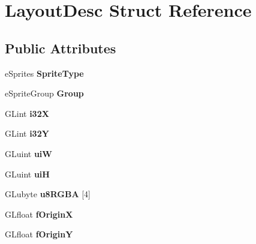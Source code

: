 \hypertarget{struct_layout_desc}{\section{Layout\+Desc Struct Reference}
\label{struct_layout_desc}
}
\subsection*{Public Attributes}
\begin{DoxyCompactItemize}
\item 
\hypertarget{struct_layout_desc_a44f11d6a49f45063d018ef98ec161255}{e\+Sprites {\bfseries Sprite\+Type}}\label{struct_layout_desc_a44f11d6a49f45063d018ef98ec161255}

\item 
\hypertarget{struct_layout_desc_a92135d802e4a7afaa841b646a730f643}{e\+Sprite\+Group {\bfseries Group}}\label{struct_layout_desc_a92135d802e4a7afaa841b646a730f643}

\item 
\hypertarget{struct_layout_desc_a47206d5249cc4ba35d05ebf4bf2d63b0}{G\+Lint {\bfseries i32\+X}}\label{struct_layout_desc_a47206d5249cc4ba35d05ebf4bf2d63b0}

\item 
\hypertarget{struct_layout_desc_a6d24bb78b1d4b19a9faa77e552e17cbe}{G\+Lint {\bfseries i32\+Y}}\label{struct_layout_desc_a6d24bb78b1d4b19a9faa77e552e17cbe}

\item 
\hypertarget{struct_layout_desc_a9f056d3db1f4117ce3c54a25918d8a4c}{G\+Luint {\bfseries ui\+W}}\label{struct_layout_desc_a9f056d3db1f4117ce3c54a25918d8a4c}

\item 
\hypertarget{struct_layout_desc_aec3b6d62348e23c3b4f25fdcb90a6f77}{G\+Luint {\bfseries ui\+H}}\label{struct_layout_desc_aec3b6d62348e23c3b4f25fdcb90a6f77}

\item 
\hypertarget{struct_layout_desc_a4fcb0d46125f1c02999e41e9b1efceac}{G\+Lubyte {\bfseries u8\+R\+G\+B\+A} \mbox{[}4\mbox{]}}\label{struct_layout_desc_a4fcb0d46125f1c02999e41e9b1efceac}

\item 
\hypertarget{struct_layout_desc_a1ee1b41945e7f672261cad346c716e6b}{G\+Lfloat {\bfseries f\+Origin\+X}}\label{struct_layout_desc_a1ee1b41945e7f672261cad346c716e6b}

\item 
\hypertarget{struct_layout_desc_abfbf8d89b5ad35b8994b4fde14637fbd}{G\+Lfloat {\bfseries f\+Origin\+Y}}\label{struct_layout_desc_abfbf8d89b5ad35b8994b4fde14637fbd}


\end{DoxyCompactItemize}
